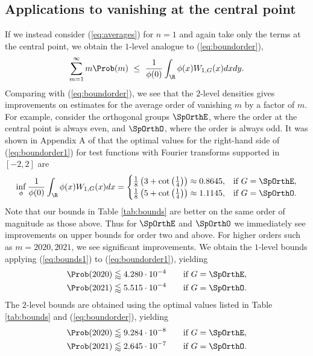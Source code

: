\documentclass[12pt, reqno]{amsart}
\numberwithin{equation}{section}
\theoremstyle{definition}
\theoremstyle{remark}
\begin{document}
\subsection{Applications to vanishing at the central point}
If we instead consider (\ref{eq:averages}) for $n = 1$ and again take only the terms at the central point, we obtain the $1$-level analogue to (\ref{eq:boundorder}),
\begin{equation}
	\sum_{m = 1}^\infty m \Prob(m) \ \leq \ \frac{1}{\phi(0)} \int_\R \phi(x) W_{1, G} (x) dx dy \label{eq:boundorder1}.
\end{equation}
Comparing with (\ref{eq:boundorder}), we see that the $2$-level densities gives improvements on estimates for the average order of vanishing $m$ by a factor of $m$. For example, consider the orthogonal groups $\SpOrthE$, where the order at the central point is always even, and $\SpOrthO$, where the order is always odd. It was shown in Appendix A of \cite{ILS} that the optimal values for the right-hand side of (\ref{eq:boundorder1}) for test functions with Fourier transforms supported in $[-2, 2]$ are
\begin{equation}
	\inf_\phi \frac{1}{\phi(0)} \int_\R \phi(x) W_{1, G} (x) dx
		=
		\begin{cases}
			\frac18 \left(3 + \cot\left(\frac14\right)\right) \approx 0.8645, 		&\text{if } G = \SpOrthE, \\
			\frac18 \left(5 + \cot\left(\frac14\right)\right) \approx 1.1145, 		&\text{if } G = \SpOrthO.
		\end{cases}	\label{eq:bounds1}
\end{equation}
Note that our bounds in Table \ref{tab:bounds} are better on the same order of magnitude as those above. Thus for $\SpOrthE$ and $\SpOrthO$ we immediately see improvements on upper bounds for order two and above. For higher orders such as $m = 2020, 2021$, we see significant improvements. We obtain the $1$-level bounds applying (\ref{eq:bounds1}) to (\ref{eq:boundorder1}), yielding
\begin{align}
	\Prob(2020) &\lessapprox 4.280 \cdot 10^{-4} \qquad \text{if } G = \SpOrthE,\\
	\Prob(2021) &\lessapprox 5.515 \cdot 10^{-4} \qquad \text{if } G = \SpOrthO.
\end{align}
The $2$-level bounds are obtained using the optimal values listed in Table \ref{tab:bounds} and (\ref{eq:boundorder}), yielding
\begin{align}
	\Prob(2020) &\lessapprox 9.284\cdot 10^{-8} \qquad \text{if } G = \SpOrthE,\\
	\Prob(2021) &\lessapprox 2.645 \cdot 10^{-7} \qquad \text{if } G = \SpOrthO.
\end{align}
\end{document}
